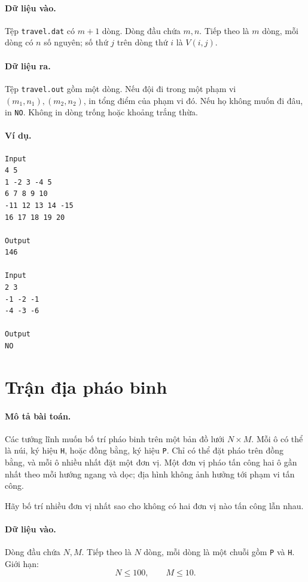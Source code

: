 \documentclass[11pt]{article}
\begin{document}
\paragraph{Dữ liệu vào.}
Tệp \texttt{travel.dat} có $m+1$ dòng. Dòng đầu chứa $m,n$. Tiếp theo là
$m$ dòng, mỗi dòng có $n$ số nguyên; số thứ $j$ trên dòng thứ $i$ là
$V(i,j)$.

\paragraph{Dữ liệu ra.}
Tệp \texttt{travel.out} gồm một dòng. Nếu đội đi trong một phạm vi
$(m_1,n_1),(m_2,n_2)$, in tổng điểm của phạm vi đó. Nếu họ không muốn đi đâu,
in \texttt{NO}. Không in dòng trống hoặc khoảng trắng thừa.

\paragraph{Ví dụ.}
\begin{verbatim}
Input
4 5
1 -2 3 -4 5
6 7 8 9 10
-11 12 13 14 -15
16 17 18 19 20

Output
146

Input
2 3
-1 -2 -1
-4 -3 -6

Output
NO
\end{verbatim}

\section{Trận địa pháo binh}

\paragraph{Mô tả bài toán.}
Các tướng lĩnh muốn bố trí pháo binh trên một bản đồ lưới $N\times M$. Mỗi ô
có thể là núi, ký hiệu \texttt{H}, hoặc đồng bằng, ký hiệu \texttt{P}. Chỉ có
thể đặt pháo trên đồng bằng, và mỗi ô nhiều nhất đặt một đơn vị. Một đơn vị
pháo tấn công hai ô gần nhất theo mỗi hướng ngang và dọc; địa hình không ảnh
hưởng tới phạm vi tấn công.

Hãy bố trí nhiều đơn vị nhất sao cho không có hai đơn vị nào tấn công lẫn
nhau.

\paragraph{Dữ liệu vào.}
Dòng đầu chứa $N,M$. Tiếp theo là $N$ dòng, mỗi dòng là một chuỗi gồm
\texttt{P} và \texttt{H}. Giới hạn:
\[
  N\le 100,\qquad M\le 10.
\]
\end{document}
